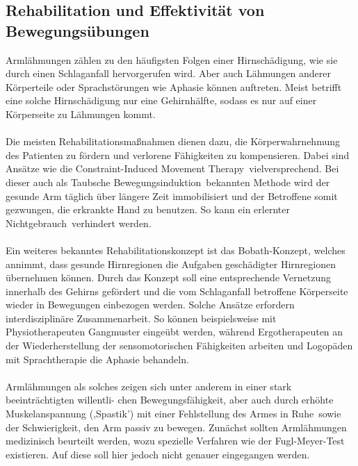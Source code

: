 \subsection{Rehabilitation und Effektivität von Bewegungsübungen}
Armlähmungen zählen zu den häufigsten Folgen einer Hirnschädigung, wie sie durch einen Schlaganfall hervorgerufen wird.\cite{Src:DGNeurorehab} Aber auch Lähmungen anderer Körperteile oder Sprachstörungen wie Aphasie können auftreten.\cite{Src:ApoWiki} Meist betrifft eine solche Hirnschädigung nur eine Gehirnhälfte, sodass es nur auf einer Körperseite zu Lähmungen kommt. \\ \\
Die meisten Rehabilitationsmaßnahmen dienen dazu, die Körperwahrnehmung des Patienten zu fördern und verlorene Fähigkeiten zu kompensieren. Dabei sind Ansätze wie die \glqq Constraint-Induced Movement Therapy\grqq ~vielversprechend. Bei dieser auch als \glqq Taubsche Bewegungsinduktion\grqq ~bekannten Methode wird der gesunde Arm täglich über längere Zeit immobilisiert und der Betroffene somit gezwungen, die erkrankte Hand zu benutzen.\cite{Src:ApoWiki} So kann ein \glqq erlernter Nichtgebrauch\grqq ~verhindert werden. \cite{Src:RehabNelles}\\ \\
Ein weiteres bekanntes Rehabilitationskonzept ist das Bobath-Konzept, welches annimmt, dass gesunde Hirnregionen die Aufgaben geschädigter Hirnregionen übernehmen können. Durch das Konzept soll eine entsprechende Vernetzung innerhalb des Gehirns gefördert und die vom Schlaganfall betroffene Körperseite wieder in Bewegungen einbezogen werden.\cite{Src:BobathFlex} Solche Ansätze erfordern interdisziplinäre Zusammenarbeit. So können beispielsweise mit Physiotherapeuten Gangmuster eingeübt werden, während Ergotherapeuten an der Wiederherstellung der sensomotorischen Fähigkeiten arbeiten und Logopäden mit Sprachtherapie die Aphasie behandeln.\cite{Src:ApoWiki} \\ \\
Armlähmungen als solches zeigen sich unter anderem in einer stark beeinträchtigten willentli-
chen Bewegungsfähigkeit, aber auch durch \glqq  erhöhte Muskelanspannung (,Spastik') mit einer Fehlstellung des Armes in Ruhe\grqq ~sowie der Schwierigkeit, den Arm passiv zu bewegen. \cite{Src:DGNeurorehab} Zunächst sollten Armlähmungen medizinisch beurteilt werden, wozu spezielle Verfahren wie der Fugl-Meyer-Test existieren. Auf diese soll hier jedoch nicht genauer eingegangen werden. \\ \\
